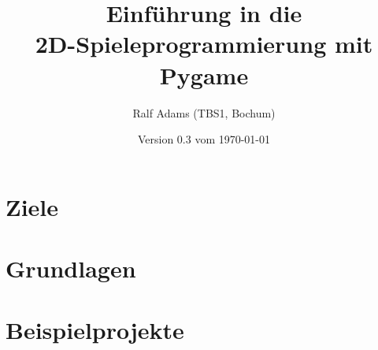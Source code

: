 \documentclass[a4paper,12pt,oneside]{scrreprt}
\begin{document}
  \title{Einführung in die\\2D-Spieleprogrammierung mit Pygame}
  \author{Ralf Adams (TBS1, Bochum)}
  \date{Version 0.3 vom \today}
  \maketitle
  \tableofcontents

\setlength{\parindent}{0.0em}
\setlength{\parskip}{1.0ex plus0.5ex minus0.5ex}
\setlength{\itemsep}{-0.3ex plus0.2ex}


\chapter{Ziele}
\chapter{Grundlagen}\label{secGrundlagen}












\chapter{Beispielprojekte}


\listoffigures
\lstlistoflistings

\printglossaries
\printindex
{}
\end{document}
